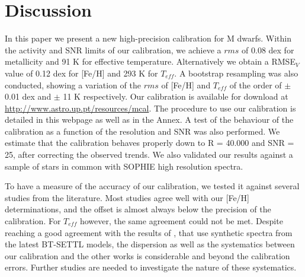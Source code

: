 \documentclass{aa}
\begin{document}




\section{Discussion}
\label{sec:discussion}

In this paper we present a new high-precision calibration for M dwarfs. Within the activity and SNR limits of our calibration, we achieve a $rms$ of 0.08 dex for metallicity and 91 K for effective temperature. Alternatively we obtain a RMSE$_{V}$ value of 0.12 dex for [Fe/H] and 293 K for $T_{eff}$. A bootstrap resampling was also conducted, showing a variation of the $rms$ of [Fe/H] and $T_{eff}$ of the order of $\pm$ 0.01 dex and $\pm$ 11 K respectively. Our calibration is available for download at \url{http://www.astro.up.pt/resources/mcal}. The procedure to use our calibration is detailed in this webpage as well as in the Annex. A test of the behaviour of the calibration as a function of the resolution and SNR was also performed. We estimate that the calibration behaves properly down to R = 40.000 and SNR = 25, after correcting the observed trends. We also validated our results against a sample of stars in common with SOPHIE high resolution spectra.


To have a measure of the accuracy of our calibration, we tested it against several studies from the literature. Most studies agree well with our [Fe/H] determinations, and the offset is almost always below the precision of the calibration. For $T_{eff}$ however, the same agreement could not be met. Despite reaching a good agreement with the results of \citet{Rajpurohit-2013a}, that use synthetic spectra from the latest BT-SETTL models, the dispersion as well as the systematics between our calibration and the other works is considerable and beyond the calibration errors. Further studies are needed to investigate the nature of these systematics. 

\end{document}
